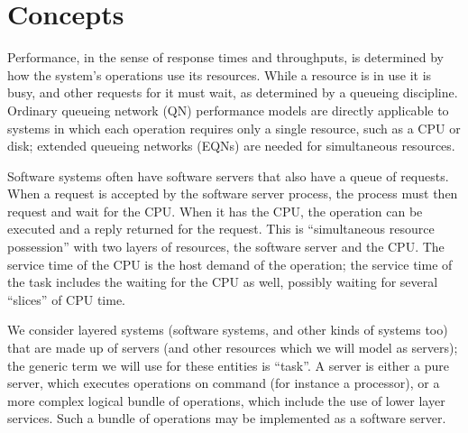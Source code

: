 \documentclass[11pt]{article}
\begin{document}
\section{Concepts}
\label{sec:concept}

Performance, in the sense of response times and throughputs, is determined by how the
system's operations use its resources. While a resource is in use it is busy, and other requests for it
must wait, as determined by a queueing discipline. Ordinary queueing network (QN) performance
models are directly applicable to systems in which each operation requires only a single resource,
such as a CPU or disk; extended queueing networks (EQNs) are needed for simultaneous resources.

Software systems often have software servers that also have a queue of requests. When a
request is accepted by the software server process, the process must then request and wait for the
CPU. When it has the CPU, the operation can be executed and a reply returned for the request. This
is ``simultaneous resource possession'' with two layers of resources, the software server and the
CPU. The service time of the CPU is the host demand of the operation; the service time of the task
includes the waiting for the CPU as well, possibly waiting for several
``slices'' of CPU time.

We consider layered systems (software systems, and other kinds of
systems too) that are made up of servers (and other resources which we
will model as servers); the generic term we will use for these
entities is ``task''. A server is either a pure server, which executes
operations on command (for instance a processor), or a more complex
logical bundle of operations, which include the use of lower layer
services. Such a bundle of operations may be implemented as a software
server.
\end{document}
